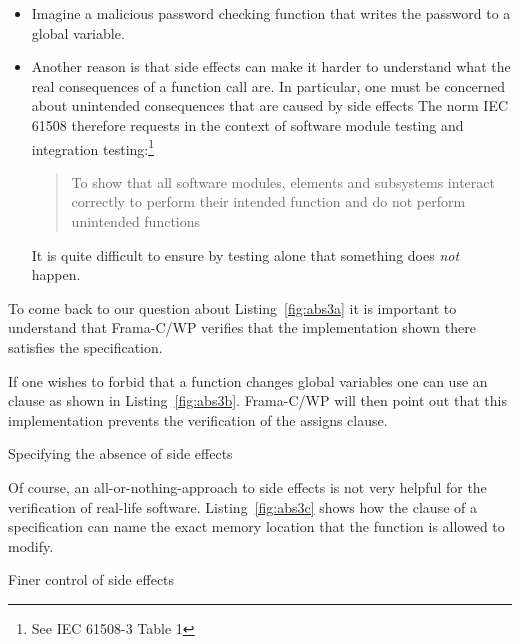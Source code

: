 \begin{itemize}
\item
Imagine a malicious password checking function that writes the password to
a global variable.

\item
Another reason is that side effects can make it harder to understand what 
the real consequences of a function call are.
In particular, one must be concerned about unintended consequences that
are caused by side effects
The norm IEC 61508 therefore requests in the context of software module testing
and integration testing:\footnote{%
   See IEC 61508-3 Table 1
}

\begin{quote}
To show that all software modules,
elements and subsystems interact correctly
to perform their intended function and do not perform unintended functions
\end{quote}

It is quite difficult to ensure by testing alone that something does \emph{not}
happen.
\end{itemize}

To come back to our question about Listing~\ref{fig:abs3a} it is important
to understand that Frama-C\slash WP verifies that the implementation shown there
satisfies the specification.

\clearpage 

If one wishes to forbid that a function changes global variables
one can use an  clause as shown in Listing~\ref{fig:abs3b}.
Frama-C\slash WP will then point out that this implementation prevents
the verification of the assigns clause.

\begin{listing}[hbt]
\begin{minipage}{\textwidth}

\end{minipage}
\caption{\label{fig:abs3b} Specifying the absence of side effects}
\end{listing}

\clearpage

Of course, an all-or-nothing-approach to side effects is not very helpful
for the verification of real-life software.
Listing~\ref{fig:abs3c} shows how the  clause of a
specification can name the exact memory location that the
function is allowed to modify.

\begin{listing}[hbt]
\begin{minipage}{\textwidth}

\end{minipage}
\caption{\label{fig:abs3c} Finer control of side effects}
\end{listing}


